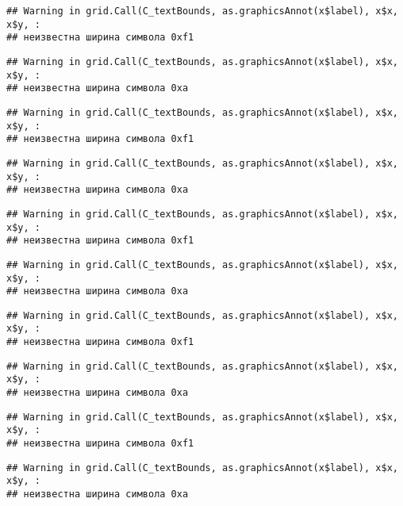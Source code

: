 \documentclass[
]{article}
\begin{document}
\begin{verbatim}
## Warning in grid.Call(C_textBounds, as.graphicsAnnot(x$label), x$x, x$y, :
## неизвестна ширина символа 0xf1
\end{verbatim}

\begin{verbatim}
## Warning in grid.Call(C_textBounds, as.graphicsAnnot(x$label), x$x, x$y, :
## неизвестна ширина символа 0xa
\end{verbatim}

\begin{verbatim}
## Warning in grid.Call(C_textBounds, as.graphicsAnnot(x$label), x$x, x$y, :
## неизвестна ширина символа 0xf1
\end{verbatim}

\begin{verbatim}
## Warning in grid.Call(C_textBounds, as.graphicsAnnot(x$label), x$x, x$y, :
## неизвестна ширина символа 0xa
\end{verbatim}

\begin{verbatim}
## Warning in grid.Call(C_textBounds, as.graphicsAnnot(x$label), x$x, x$y, :
## неизвестна ширина символа 0xf1
\end{verbatim}

\begin{verbatim}
## Warning in grid.Call(C_textBounds, as.graphicsAnnot(x$label), x$x, x$y, :
## неизвестна ширина символа 0xa
\end{verbatim}

\begin{verbatim}
## Warning in grid.Call(C_textBounds, as.graphicsAnnot(x$label), x$x, x$y, :
## неизвестна ширина символа 0xf1
\end{verbatim}

\begin{verbatim}
## Warning in grid.Call(C_textBounds, as.graphicsAnnot(x$label), x$x, x$y, :
## неизвестна ширина символа 0xa
\end{verbatim}

\begin{verbatim}
## Warning in grid.Call(C_textBounds, as.graphicsAnnot(x$label), x$x, x$y, :
## неизвестна ширина символа 0xf1
\end{verbatim}

\begin{verbatim}
## Warning in grid.Call(C_textBounds, as.graphicsAnnot(x$label), x$x, x$y, :
## неизвестна ширина символа 0xa
\end{verbatim}
\end{document}

